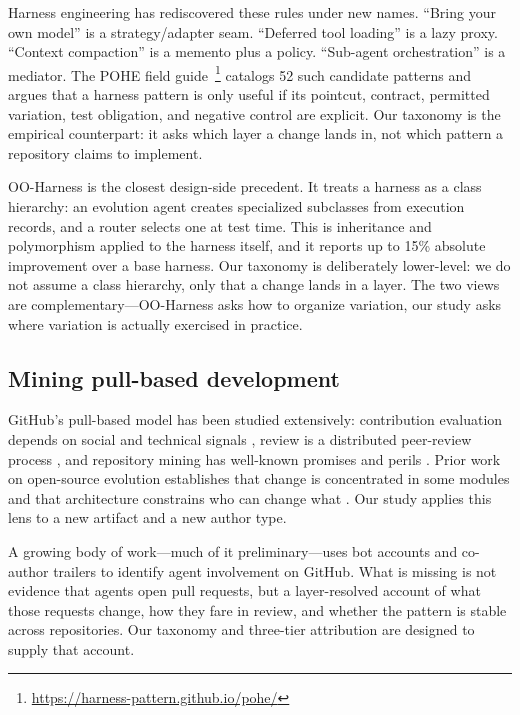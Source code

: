 \documentclass[sigconf,review]{acmart}
\begin{document}
Harness engineering has rediscovered these rules under new names. ``Bring your own model'' is a strategy/adapter seam. ``Deferred tool loading'' is a lazy proxy. ``Context compaction'' is a memento plus a policy. ``Sub-agent orchestration'' is a mediator. The POHE field guide~\footnote{\url{https://harness-pattern.github.io/pohe/}} catalogs 52 such candidate patterns and argues that a harness pattern is only useful if its pointcut, contract, permitted variation, test obligation, and negative control are explicit. Our taxonomy is the empirical counterpart: it asks which layer a change lands in, not which pattern a repository claims to implement.

OO-Harness \citep{li2026ooharness} is the closest design-side precedent. It treats a harness as a class hierarchy: an evolution agent creates specialized subclasses from execution records, and a router selects one at test time. This is inheritance and polymorphism applied to the harness itself, and it reports up to 15\% absolute improvement over a base harness. Our taxonomy is deliberately lower-level: we do not assume a class hierarchy, only that a change lands in a layer. The two views are complementary---OO-Harness asks how to organize variation, our study asks where variation is actually exercised in practice.

\subsection{Mining pull-based development}

GitHub's pull-based model has been studied extensively: contribution evaluation depends on social and technical signals \citep{tsay2014}, review is a distributed peer-review process \citep{rigby2008}, and repository mining has well-known promises and perils \citep{kalliamvakou2014,bird2009}. Prior work on open-source evolution establishes that change is concentrated in some modules and that architecture constrains who can change what \citep{mockus2002,herbsleb2003,nagappan2008}. Our study applies this lens to a new artifact and a new author type.

A growing body of work---much of it preliminary---uses bot accounts and co-author trailers to identify agent involvement on GitHub. What is missing is not evidence that agents open pull requests, but a layer-resolved account of what those requests change, how they fare in review, and whether the pattern is stable across repositories. Our taxonomy and three-tier attribution are designed to supply that account.
\end{document}

